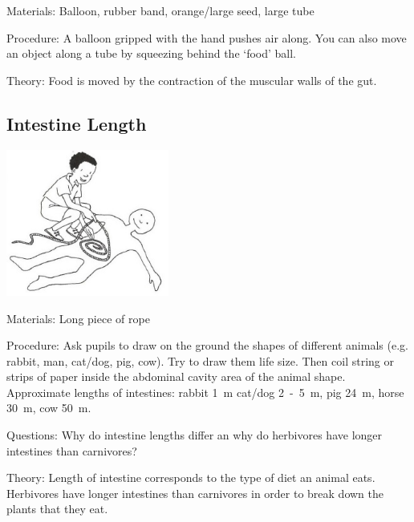 \begin{multicols}{2}
\begin{description*}
\item[Materials:]{Balloon, rubber band, orange/large seed, large tube}
\item[Procedure:]{A balloon gripped with the hand
pushes air along. You can also
move an object along a tube by
squeezing behind the `food' ball.}
\item[Theory:]{Food is moved by the contraction
of the muscular walls of the gut.}
\end{description*}

\subsection{Intestine Length} %

\begin{center}
\includegraphics[width=0.4\textwidth]{./img/vso/intestine-length.jpg}
\end{center}

\begin{description*}
\item[Materials:]{Long piece of rope}
\item[Procedure:]{Ask pupils to draw on the ground the shapes of different animals (e.g. rabbit, man, cat/dog,
pig, cow). Try to draw them life size. Then coil string or strips of paper inside the abdominal
cavity area of the animal shape. Approximate lengths of intestines: rabbit 1~m
cat/dog 2~-~5~m, pig 24~m, horse 30~m, cow 50~m.}
\item[Questions:]{Why do intestine lengths differ an why do herbivores have longer intestines than carnivores?}
\item[Theory:]{Length of intestine corresponds to the type of diet an animal eats. Herbivores have longer
intestines than carnivores in order to break down the plants that they eat.}
\end{description*}


\end{multicols}
